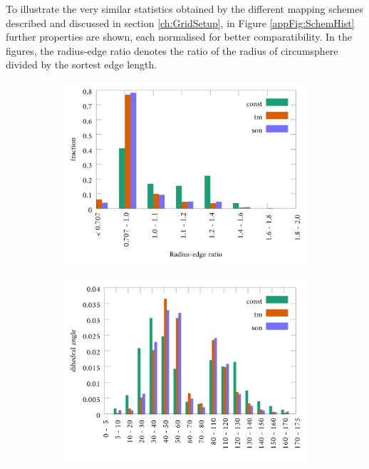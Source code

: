 To illustrate the very similar statistics obtained by the different mapping schemes described and discussed in section \ref{ch:GridSetup}, in Figure \ref{appFig:SchemHist} further properties are shown, each normalised for better comparatibility.
In the figures, the radius-edge ratio denotes the ratio of the radius of circumsphere divided by the sortest edge length.
\begin{figure}
\begin{subfigure}{0.5\textwidth}
\includegraphics[width=\textwidth]{Figures/App/Rad_histAp1.pdf}
\end{subfigure}
\begin{subfigure}{0.5\textwidth}
\includegraphics[width=\textwidth]{Figures/App/Rad_histAp2.pdf}

\end{subfigure}
\end{figure}
